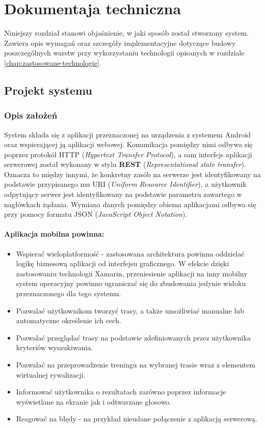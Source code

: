 \chapter{Dokumentaja techniczna}\label{chap:dokumentacja-techniczna}
Niniejszy rozdział stanowi objaśnienie, w jaki sposób został stworzony system. Zawiera opis wymagań oraz szczegóły implementacyjne dotyczące budowy poszczególnych warstw przy wykorzystaniu technologii opisanych w rozdziale \ref{chap:zastosowane-technologie}.
\section{Projekt systemu}
\subsection{Opis założeń}
System składa się z aplikacji przeznaczonej na urządzenia z systemem Android \cite{android} oraz wspierającej ją aplikacji webowej. Komunikacja pomiędzy nimi odbywa się poprzez protokół HTTP (\textit{Hypertext Transfer Protocol}), a sam interfejs aplikacji serwerowej został wykonany w stylu \textbf{REST} (\textit{Representational state transfer}). Oznacza to między innymi, że konkretny zasób na serwerze jest identyfikowany na podstawie przypisanego mu URI (\textit{Uniform Resource Identifier}), a użytkownik odpytujący serwer jest identyfikowany na podstawie parametru zawartego w nagłówkach żądania. Wymiana danych pomiędzy obiema aplikacjami odbywa się przy pomocy formatu JSON (\textit{JavaScript Object Notation}). \cite{ksiazka-asp-core}

\subsubsection{Aplikacja mobilna powinna:}
\begin{itemize}
\item{Wspierać wieloplatformość} - zastosowana architektura powinna oddzielać logikę biznesową aplikacji od interfejsu graficznego. W efekcie dzięki zastosowaniu technologii Xamarin, przeniesienie aplikacji na inny mobilny system operacyjny powinno ograniczać się do zbudowania jedynie widoku przeznaczonego dla tego systemu.
\item{Pozwalać użytkownikom tworzyć trasy, a także umożliwiać manualne lub automatyczne określenie ich cech.}
\item{Pozwalać przeglądać trasy na podstawie zdefiniowanych przez użytkownika kryteriów wyszukiwania.}
\item{Pozwalać na przeprowadzenie treningu na wybranej trasie wraz z elementem wirtualnej rywalizacji.}
\item{Informować użytkownika o rezultatach zarówno poprzez informacje wyświetlane na ekranie jak i odtwarzane głosowo.}
\item{Reagować na błędy - na przykład nieudane połączenie z aplikacją serwerową.}
\end{itemize}

